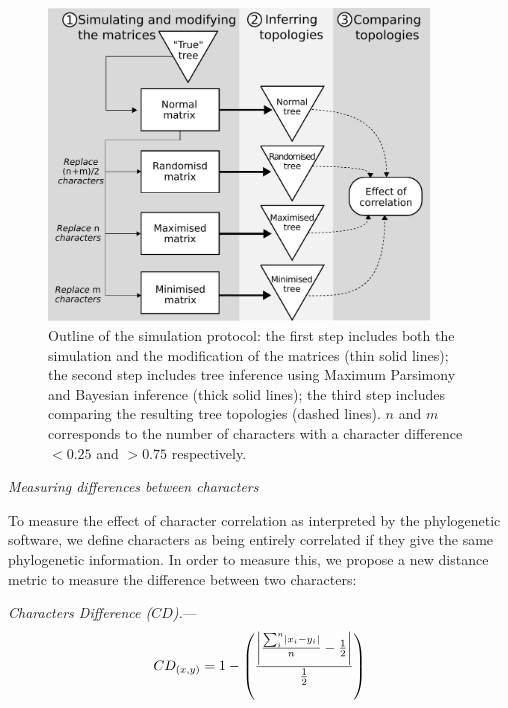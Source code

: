 \documentclass[12pt,letterpaper]{article}
\DeclarePairedDelimiter\abs{\lvert}{\rvert}%
\renewcommand{\subsection}[1]{%
\bigskip
\begin{center}
\begin{large}
\normalfont\itshape #1
\end{large}
\end{center}}
\renewcommand{\subsubsection}[1]{%
\vspace{2ex}
\noindent
\textit{#1.}---}
\begin{document}
\begin{figure}[!htbp]
\centering
   \includegraphics[width=0.9\textwidth]{Figures/outline.pdf}
\caption{Outline of the simulation protocol: the first step includes both the simulation and the modification of the matrices (thin solid lines); the second step includes tree inference using Maximum Parsimony and Bayesian inference (thick solid lines); the third step includes comparing the resulting tree topologies (dashed lines). $n$ and $m$ corresponds to the number of characters with a character difference $<0.25$ and $>0.75$ respectively.}
\label{Fig:outline}
\end{figure}

\subsection{Measuring differences between characters}
\label{CD_description}
To measure the effect of character correlation as interpreted by the phylogenetic software, we define characters as being entirely correlated if they give the same phylogenetic information.
In order to measure this, we propose a new distance metric to measure the difference between two characters:

\subsubsection{Characters Difference ($CD$)}
\begin{equation}
    CD_{(x,y)} = 1 - \left(\frac{\abs*{\frac{\sum_{i}^{n}\abs{x_{i} - y_{i}}}{n}-\frac{1}{2}}}{\frac{1}{2}}\right)
\end{equation}
\end{document}
